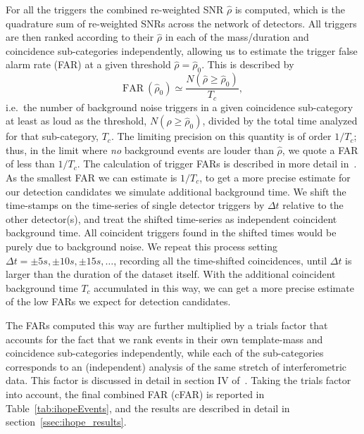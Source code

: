 \documentclass[12pt]{iopart}
\begin{document}
For all the triggers the combined
re-weighted SNR $\hat{\rho}$ is computed, which is the quadrature sum of 
re-weighted SNRs across the network of detectors. All triggers are then 
ranked according to their $\hat{\rho}$ in each of the mass/duration and 
coincidence sub-categories independently, allowing us to estimate the 
trigger false alarm rate (FAR) at a given threshold $\hat{\rho}=\hat{\rho}_{0}$.
This is described by 
\begin{equation}\label{eq:FARdef}
\mathrm{FAR}~(\hat{\rho}_{0}) \simeq \frac{N(\hat{\rho}\geq 
\hat{\rho}_{0})}{T_{c}},
\end{equation}
i.e.\ the number of background noise triggers in a given coincidence 
sub-category at least as loud as the threshold, $N(\hat{\rho}\geq 
\hat{\rho}_0)$, divided 
by the total time analyzed for that sub-category, $T_{c}$. The limiting 
precision on this quantity is of order $1/T_c$; thus, in the limit where 
\emph{no} background events are louder than $\hat{\rho}$, we quote a FAR of 
less than $1/T_c$. The calculation of trigger FARs is described in more detail 
in~\cite{Keppel:2009,Abbott:2009tt}. As the smallest FAR we can estimate is 
$1/T_{c}$, to get a more precise estimate for our detection candidates we 
simulate additional background time.
We shift the time-stamps on the time-series of single detector triggers by
$\Delta t$ relative to the other detector(s),
and treat the shifted time-series as independent coincident background time. All 
coincident
triggers found in the shifted times would be purely due to background noise. 
We repeat this process setting $\Delta t=\pm 5s, \pm 10s, \pm 15s,\dots$, 
recording all the
time-shifted coincidences, until $\Delta t$ is larger than the duration of the 
dataset itself. 
With the additional coincident background time $T_{c}$ accumulated in this way, 
we can get a more precise estimate of the low FARs we expect for detection 
candidates. 

The FARs computed this way are further multiplied by a trials
factor that accounts for the fact that we rank events in their own 
template-mass and coincidence sub-categories independently, while each of 
the sub-categories corresponds to an (independent) analysis of the same stretch 
of interferometric data. This factor is discussed in 
detail in section IV of~\cite{Colaboration:2011np}.
Taking the trials factor into account, the final combined FAR (cFAR) is 
reported in Table~\ref{tab:ihopeEvents}, and the results are described
in detail in section~\ref{ssec:ihope_results}.
\end{document}
